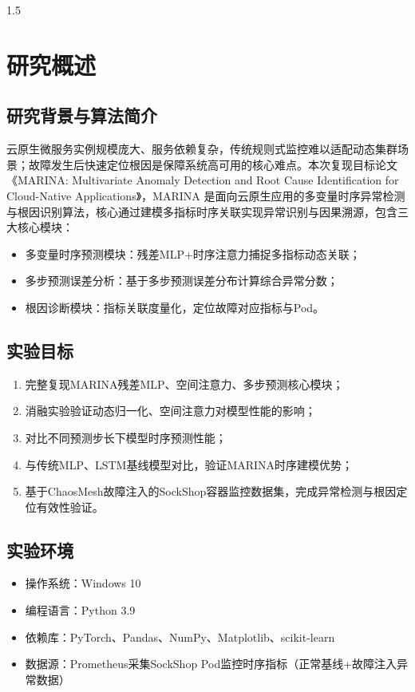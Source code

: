 \documentclass[a4paper,12pt]{report}
\begin{document}
\begin{spacing}{1.5}
\songti{}

\section{研究概述}
\subsection{研究背景与算法简介}
云原生微服务实例规模庞大、服务依赖复杂，传统规则式监控难以适配动态集群场景；故障发生后快速定位根因是保障系统高可用的核心难点。本次复现目标论文《MARINA: Multivariate Anomaly Detection and Root Cause Identification for Cloud-Native Applications》，MARINA 是面向云原生应用的多变量时序异常检测与根因识别算法，核心通过建模多指标时序关联实现异常识别与因果溯源，包含三大核心模块：
\begin{itemize}
    \item 多变量时序预测模块：残差MLP+时序注意力捕捉多指标动态关联；
    \item 多步预测误差分析：基于多步预测误差分布计算综合异常分数；
    \item 根因诊断模块：指标关联度量化，定位故障对应指标与Pod。
\end{itemize}

\subsection{实验目标}
\begin{enumerate}
    \item 完整复现MARINA残差MLP、空间注意力、多步预测核心模块；
    \item 消融实验验证动态归一化、空间注意力对模型性能的影响；
    \item 对比不同预测步长下模型时序预测性能；
    \item 与传统MLP、LSTM基线模型对比，验证MARINA时序建模优势；
    \item 基于ChaosMesh故障注入的SockShop容器监控数据集，完成异常检测与根因定位有效性验证。
\end{enumerate}

\subsection{实验环境}
\begin{itemize}
    \item 操作系统：Windows 10
    \item 编程语言：Python 3.9
    \item 依赖库：PyTorch、Pandas、NumPy、Matplotlib、scikit-learn
    \item 数据源：Prometheus采集SockShop Pod监控时序指标（正常基线+故障注入异常数据）
\end{itemize}


\end{spacing}
\end{document}
